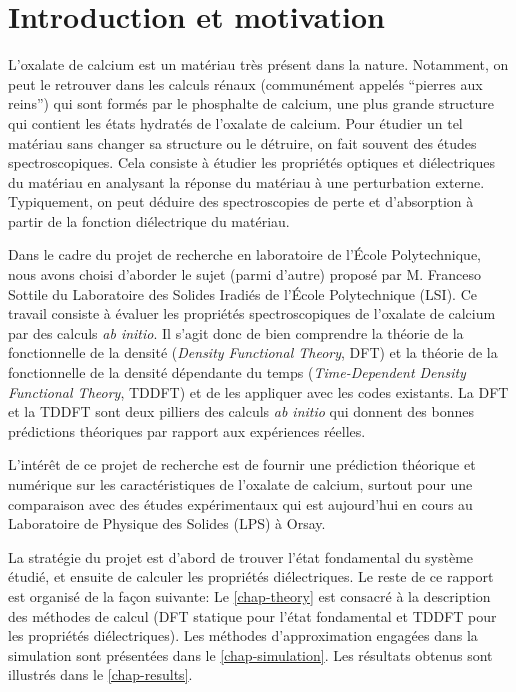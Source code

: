 \chapter{Introduction et motivation}
\label{chap-intro}
L'oxalate de calcium est un matériau très présent dans la nature.
Notamment, on peut le retrouver dans les calculs rénaux (communément appelés ``pierres aux reins'')
qui sont formés par le phosphalte de calcium,
une plus grande structure qui contient les états hydratés de l'oxalate de calcium.
Pour étudier un tel matériau sans changer sa structure ou le détruire,
on fait souvent des études spectroscopiques.
Cela consiste à étudier les propriétés optiques et diélectriques du matériau en
analysant la réponse du matériau à une perturbation externe.
Typiquement, on peut déduire des spectroscopies de perte et d'absorption
à partir de la fonction diélectrique du matériau.

Dans le cadre du projet de recherche en laboratoire de l'École Polytechnique,
nous avons choisi d'aborder le sujet (parmi d'autre) proposé par M. Franceso Sottile
du Laboratoire des Solides Iradiés de l'École Polytechnique (LSI).
Ce travail consiste à évaluer les propriétés spectroscopiques de l'oxalate de calcium par des calculs \textit{ab initio}.
Il s'agit donc de bien comprendre la théorie de la fonctionnelle de la densité
(\textit{Density Functional Theory}, DFT)
et la théorie de la fonctionnelle de la densité dépendante du temps
(\textit{Time-Dependent Density Functional Theory}, TDDFT)
et de les appliquer avec les codes existants.
La DFT et la TDDFT sont deux pilliers des calculs \textit{ab initio}
qui donnent des bonnes prédictions théoriques par rapport aux expériences réelles.

L'intérêt de ce projet de recherche est de fournir une prédiction théorique et numérique
sur les caractéristiques de l'oxalate de calcium,
surtout pour une comparaison avec des études expérimentaux qui est aujourd'hui en cours
au Laboratoire de Physique des Solides (LPS) à Orsay.

La stratégie du projet est d'abord de trouver l'état fondamental du système étudié,
et ensuite de calculer les propriétés diélectriques.
Le reste de ce rapport est organisé de la façon suivante:
Le \cref{chap-theory} est consacré à la description des méthodes de calcul
(DFT statique pour l'état fondamental et TDDFT pour les propriétés diélectriques).
Les méthodes d'approximation engagées dans la simulation sont présentées dans le \cref{chap-simulation}.
Les résultats obtenus sont illustrés dans le \cref{chap-results}.
